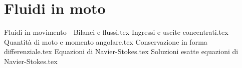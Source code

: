 %
\chapter{Fluidi in moto}
%
{Fluidi in movimento - Bilanci e flussi.tex}
{Ingressi e uscite concentrati.tex}
{Quantità di moto e momento angolare.tex}
{Conservazione in forma differenziale.tex}
{Equazioni di Navier-Stokes.tex}
{Soluzioni esatte equazioni di Navier-Stokes.tex}